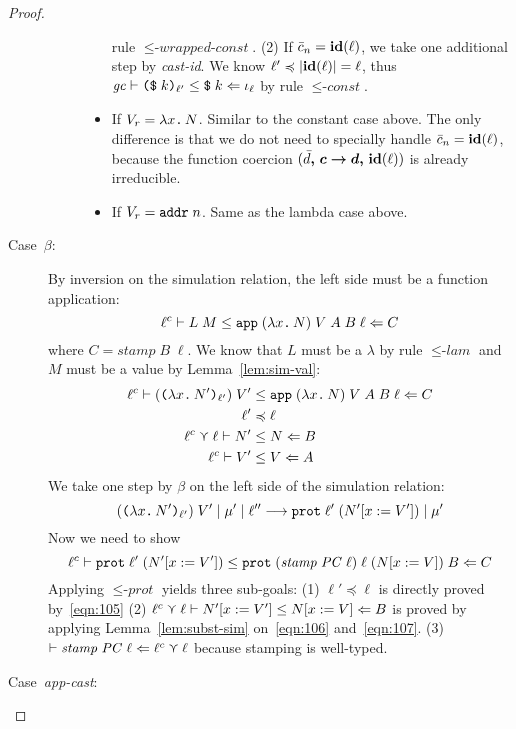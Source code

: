 \begin{proof}
\begin{description}
\begin{description}
\begin{itemize}
    rule ${\leq}\textit{-wrapped-const}$. (2) If $\bar{c}_n = \mathit{\mathbf{id}}(\ell)$, we take one additional step by
    \textit{cast-id}. We know $\ell' \preccurlyeq |\mathit{\mathbf{id}}(\ell)| = \ell$,
    thus ${\mathit{gc}}\vdash{\ensuremath{\text{\texttt{{(\$}}}\;{k}\text{\texttt{{)}}}_{\ell'}}}\leq{\ensuremath{\text{\texttt{{\$}}}\;{k}}}\Leftarrow{\iota_\ell}$
    by rule ${\leq}\textit{-const}$.
    \item If $V_r = \text{\texttt{{${\lambda}$}}}{x}\text{\texttt{{.}}}\,{N}$. Similar to the constant case above.
    The only difference is that we do not need to specially handle $\bar{c}_n=\mathit{\mathbf{id}}(\ell)$,
    because the function coercion $({{\bar{d}}\boldsymbol{,}\,{\bm{c}}\boldsymbol{\rightarrow}{\bm{d}}}\boldsymbol{,}\,{\mathit{\mathbf{id}}(\ell)})$
    is already irreducible.
    \item If $V_r = \text{\texttt{{addr}}}\;{n}$. Same as the lambda case above.
    \end{itemize}
    \end{description}
  \item[Case~$\beta$:]
      By inversion on the simulation relation, the left side must be a function application:
      \[
      {\ell^c}\vdash{L\;M}\leq{\ensuremath{\text{\texttt{{app}}}\;{(\text{\texttt{{${\lambda}$}}}{x}\text{\texttt{{.}}}\,{N})}\;{V}\;{A}\;{B}\;{\ell}}}\Leftarrow{C}
      \]
      where $C=\textit{stamp}\;B\;\ell$.
      We know that $L$ must be a $\lambda$ by rule ${\leq}\textit{-lam}$ and
      $M$ must be a value by Lemma~\ref{lem:sim-val}:
      \begin{align}
      \ell^c \vdash (\text{\texttt{{(${\lambda}$}}}{x}\text{\texttt{{.}}}\,{N'}\text{\texttt{{)}}}_{\ell'})\;V' &\leq \text{\texttt{{app}}}\;{(\text{\texttt{{${\lambda}$}}}{x}\text{\texttt{{.}}}\,{N})}\;{V}\;{A}\;{B}\;{\ell}
      \Leftarrow C \\
      \ell' &\preccurlyeq \ell       \label{eqn:105} \\
      \ell^c \curlyvee \ell \vdash N' &\leq N \Leftarrow B \label{eqn:106} \\
      \ell^c \vdash V' &\leq V \Leftarrow A \label{eqn:107}
      \end{align}
      We take one step by $\beta$ on the left side of the simulation relation:
      \[
        {(\text{\texttt{{(${\lambda}$}}}{x}\text{\texttt{{.}}}\,{N'}\text{\texttt{{)}}}_{\ell'})\;V'}\mid{\mu'}\mid{\ell''}\longrightarrow{\ensuremath{\text{\texttt{{prot}}}\;{\ell'}\;{(N'[x:=V'])}}}\mid{\mu'}
      \]
      Now we need to show
      \[
      \ell^c \vdash \text{\texttt{{prot}}}\;{\ell'}\;{(N'[x:=V'])} \leq \text{\texttt{{prot}}}\;{(\mathit{stamp}\;\mathit{PC}\;\ell)}\;{\ell}\;{(N[x:=V])}\;{B}
      \Leftarrow C
      \]
      Applying ${\leq}\textit{-prot}$ yields three sub-goals:
      (1) $\ell' \preccurlyeq \ell$ is directly proved by~\eqref{eqn:105}
      (2) ${\ell^c \curlyvee \ell}\vdash{N'[x:=V']}\leq{N[x:=V]}\Leftarrow{B}$ is proved by applying Lemma~\ref{lem:subst-sim}
          on~\eqref{eqn:106} and~\eqref{eqn:107}.
      (3) $\vdash \mathit{stamp}\;\mathit{PC}\;\ell \Leftarrow \ell^c \curlyvee \ell$ because stamping is well-typed.
  \item[Case~\textit{app-cast}:]

\end{description}
\end{proof}
